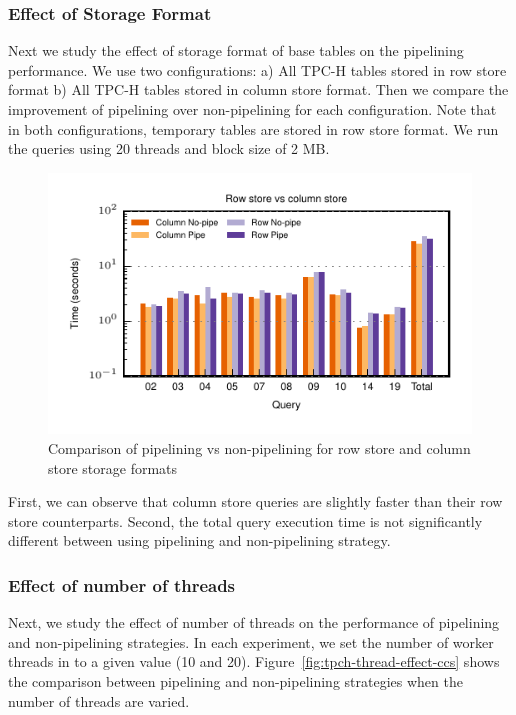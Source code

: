 \subsubsection{Effect of Storage Format}
Next we study the effect of storage format of base tables on the pipelining performance. 
We use two configurations: a) All TPC-H tables stored in row store format b) All TPC-H tables stored in column store format. 
Then we compare the improvement of pipelining over non-pipelining for each configuration. 
Note that in both configurations, temporary tables are stored in row store format. 
We run the queries using 20 threads and block size of 2 MB.

\begin{figure}
	\centering 
	\includegraphics[width=0.6\textheight]{pipeline/figures/tpch-rowstore-vs-ccs-total-time-absolute}
	\caption{Comparison of pipelining vs non-pipelining for row store and column store storage formats}
	\label{fig:tpch-rowstore-vs-ccs-total-time-absolute}
\end{figure}

First, we can observe that column store queries are slightly faster than their row store counterparts. 
Second, the total query execution time is not significantly different between using pipelining and non-pipelining strategy. 

\subsubsection{Effect of number of threads}
Next, we study the effect of number of threads on the performance of pipelining and non-pipelining strategies. 
In each experiment, we set the number of worker threads in \sys{} to a given value (10 and 20).
Figure~\ref{fig:tpch-thread-effect-ccs} shows the comparison between pipelining and non-pipelining strategies when the number of threads are varied. 


